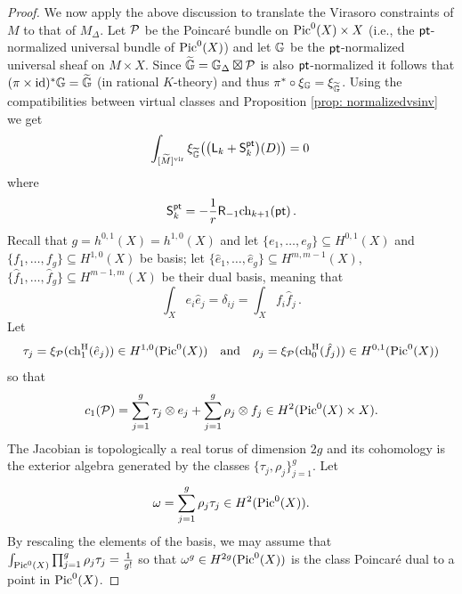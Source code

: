 \documentclass[a4paper, 12pt]{amsart}
\begin{document}
\begin{proof}
We now apply the above discussion to translate the Virasoro constraints of $M$ to that of $M_\Delta$. Let ${\mathcal P}$ be the Poincaré bundle on $\mathop{\rm Pic}\nolimits^0(X)\times X$ (i.e., the ${\mathsf{pt}}$-normalized universal bundle of $\mathop{\rm Pic}\nolimits^0(X)$) and let ${\mathbb{G}}$ be the ${\mathsf{pt}}$-normalized universal sheaf on $M\times X$. Since $\widetilde{{\mathbb{G}}}={\mathbb{G}}_\Delta\boxtimes {\mathcal P}$ is also ${\mathsf{pt}}$-normalized it follows that $(\pi\times \operatorname{id})^\ast {\mathbb{G}}=\widetilde {{\mathbb{G}}}$ (in rational $K$-theory) and thus $\pi^\ast\circ \xi_{{\mathbb{G}}}=\xi_{\widetilde {{\mathbb{G}}}}$. Using the compatibilities between virtual classes and Proposition \ref{prop: normalizedvsinv} we get
\begin{equation}\label{eq: virasoromtilde}
\int_{[\widetilde M]^{\mathrm{vir}}}\xi_{\widetilde {{\mathbb{G}}}}\big(\big({\mathsf{L}}_k+{\mathsf{S}}_k^{\mathsf{pt}}\big)(D)\big)=0\,
\end{equation}
where $${\mathsf{S}}_k^{\mathsf{pt}}=-\frac{1}{r}\mathsf{R}_{-1}\mathrm{ch}_{k+1}({\mathsf{pt}})\,.$$
Recall that $g=h^{0,1}(X)=h^{1,0}(X)$ and let $\{e_1, \ldots, e_g\}\subseteq H^{0,1}(X)$ and $\{f_1, \ldots, f_g\}\subseteq H^{1,0}(X)$ be basis; let $\{\hat e_1, \ldots, \hat e_g\}\subseteq H^{m, m-1}(X)$, $\{\hat f_1, \ldots, \hat f_g\}\subseteq H^{m-1, m}(X)$ be their dual basis, meaning that 
\[\int_X e_i \hat e_j=\delta_{ij}=\int_X f_i \hat f_j\,.\]
Let 
\[\tau_j=\xi_{{\mathcal P}}(\mathrm{ch}^{\mathrm{H}}_1(\hat e_j))\in H^{1,0}(\mathop{\rm Pic}\nolimits^0(X))\quad \textup{and}\quad \rho_j=\xi_{{\mathcal P}}(\mathrm{ch}^{\mathrm{H}}_0(\hat f_j))\in H^{0,1}(\mathop{\rm Pic}\nolimits^0(X))\]
so that
\[c_1({\mathcal P})=\sum_{j=1}^g \tau_j\otimes e_j+\sum_{j=1}^g \rho_j\otimes f_j\in H^2(\mathop{\rm Pic}\nolimits^0(X)\times X).\]
The Jacobian is topologically a real torus of dimension $2g$ and its cohomology is the exterior algebra generated by the classes $\{\tau_j, \rho_j\}_{j=1}^g$.
Let
\[\omega=\sum_{j=1}^g \rho_j\tau_j\in H^2(\mathop{\rm Pic}\nolimits^0(X)).\]
By rescaling the elements of the basis, we may assume that $\int_{\mathop{\rm Pic}\nolimits^0(X)}\prod_{j=1}^g \rho_j\tau_j=\frac{1}{g!}$ so that $\omega^g\in H^{2g}(\mathop{\rm Pic}\nolimits^0(X))$ is the class Poincaré dual to a point in $\mathop{\rm Pic}\nolimits^0(X)$.


\end{proof}
\end{document}
